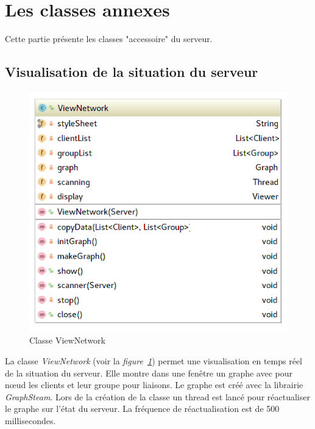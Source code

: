 \documentclass[a4paper,11pt]{report}
\begin{document}
\section{Les classes annexes}

Cette partie présente les classes "accessoire" du serveur.

\subsection{Visualisation de la situation du serveur}

    \begin{figure}[th]
      \begin{center}
        \includegraphics[scale=0.3]{Assets/UML_Network.png}
        \caption{Classe ViewNetwork}
        \label{Classe ViewNetwork}
      \end{center}
    \end{figure}
    
    La classe \textit{ViewNetwork} (voir la \textit{figure~\ref{Classe ViewNetwork}}) permet une visualisation en temps réel de la situation du serveur. Elle montre dans une fenêtre un graphe avec pour nœud les clients et leur groupe pour liaisons. Le graphe est créé avec la librairie \textit{GraphSteam}. Lors de la création de la classe un thread est lancé pour réactualiser le graphe sur l’état du serveur. La fréquence de réactualisation est de 500 millisecondes.
\end{document}
